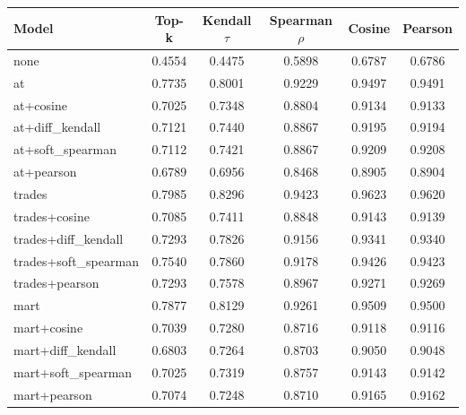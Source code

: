 \begin{tabular}{lccccc}
\toprule
Model & Top-k & Kendall $\tau$ & Spearman $\rho$ & Cosine & Pearson \\
\midrule
none & 0.4554 & 0.4475 & 0.5898 & 0.6787 & 0.6786 \\
at & 0.7735 & 0.8001 & 0.9229 & 0.9497 & 0.9491 \\
at+cosine & 0.7025 & 0.7348 & 0.8804 & 0.9134 & 0.9133 \\
at+diff_kendall & 0.7121 & 0.7440 & 0.8867 & 0.9195 & 0.9194 \\
at+soft_spearman & 0.7112 & 0.7421 & 0.8867 & 0.9209 & 0.9208 \\
at+pearson & 0.6789 & 0.6956 & 0.8468 & 0.8905 & 0.8904 \\
trades & 0.7985 & 0.8296 & 0.9423 & 0.9623 & 0.9620 \\
trades+cosine & 0.7085 & 0.7411 & 0.8848 & 0.9143 & 0.9139 \\
trades+diff_kendall & 0.7293 & 0.7826 & 0.9156 & 0.9341 & 0.9340 \\
trades+soft_spearman & 0.7540 & 0.7860 & 0.9178 & 0.9426 & 0.9423 \\
trades+pearson & 0.7293 & 0.7578 & 0.8967 & 0.9271 & 0.9269 \\
mart & 0.7877 & 0.8129 & 0.9261 & 0.9509 & 0.9500 \\
mart+cosine & 0.7039 & 0.7280 & 0.8716 & 0.9118 & 0.9116 \\
mart+diff_kendall & 0.6803 & 0.7264 & 0.8703 & 0.9050 & 0.9048 \\
mart+soft_spearman & 0.7025 & 0.7319 & 0.8757 & 0.9143 & 0.9142 \\
mart+pearson & 0.7074 & 0.7248 & 0.8710 & 0.9165 & 0.9162 \\
\bottomrule
\end{tabular}
